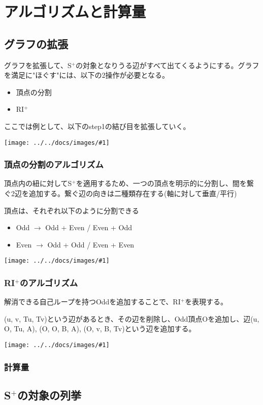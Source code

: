 \documentclass[11pt,a4j]{jarticle}
\newcommand{\splus}{S${}^\text{+}$}
\newcommand{\riplus}{RI${}^\text{+}$}
\newcommand{\image}[1]{\begin{center}\texttt{[image: ../../docs/images/\#1]}\end{center}}
\begin{document}
\section{アルゴリズムと計算量}

\subsection{グラフの拡張}
グラフを拡張して、\splus の対象となりうる辺がすべて出てくるようにする。グラフを満足に"ほぐす"には、以下の2操作が必要となる。
\begin{itemize}
    \item 頂点の分割
    \item \riplus
\end{itemize}

ここでは例として、以下のstep1の結び目を拡張していく。
\image{extend_default.jpg}

\subsubsection{頂点の分割のアルゴリズム}
頂点内の紐に対して\splus を適用するため、一つの頂点を明示的に分割し、間を繋ぐ2辺を追加する。繋ぐ辺の向きは二種類存在する(軸に対して垂直/平行)

頂点は、それぞれ以下のように分割できる
\begin{itemize}
    \item Odd $\rightarrow$ Odd + Even / Even + Odd
    \item Even $\rightarrow$ Odd + Odd / Even + Even
\end{itemize}

\image{extend_split.jpg}

\subsubsection{\riplus のアルゴリズム}
解消できる自己ループを持つOddを追加することで、\riplus を表現する。

(u, v, Tu, Tv)という辺があるとき、その辺を削除し、Odd頂点Oを追加し、辺(u, O, Tu, A), (O, O, B, A), (O, v, B, Tv)という辺を追加する。

\image{extend_riplus.jpg}


\subsubsection{計算量}

\subsection{\splus の対象の列挙}
\label{enum}
\end{document}
